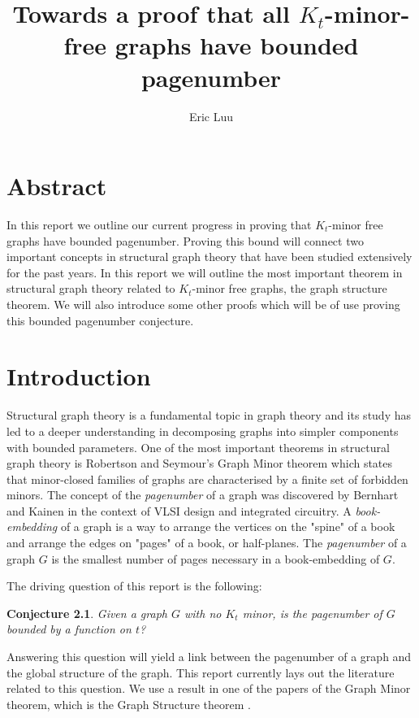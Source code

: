\documentclass[]{report}
\title{Towards a proof that all $K_t$-minor-free graphs have bounded pagenumber}
\author{Eric Luu}
\newtheorem{conjecture}[theorem]{Conjecture}
\theoremstyle{definition}
\numberwithin{theorem}{section}
\numberwithin{equation}{section}
\begin{document}
\maketitle
\chapter{Abstract}\label{abstract}
In this report we outline our current progress in proving that $K_t$-minor free graphs have bounded pagenumber. Proving this bound will connect two important concepts in structural graph theory that have been studied extensively for the past years. In this report we will outline the most important theorem in structural graph theory related to $K_t$-minor free graphs, the graph structure theorem. We will also introduce some other proofs which will be of use proving this bounded pagenumber conjecture. 
\chapter{Introduction}\label{sec:introduction}
Structural graph theory is a fundamental topic in graph theory and its study has led to a deeper understanding in decomposing graphs into simpler components with bounded parameters. One of the most important theorems in structural graph theory is Robertson and Seymour's Graph Minor theorem \cite{robertsonGraphMinorsXX2004} which states that minor-closed families of graphs are characterised by a finite set of forbidden minors. 
The concept of the \textit{pagenumber} of a graph was discovered by Bernhart and Kainen \cite{bernhartBookThicknessGraph1979} in the context of VLSI design and integrated circuitry. A \textit{book-embedding} of a graph is a way to arrange the vertices on the "spine" of a book and arrange the edges on "pages" of a book, or half-planes. The \textit{pagenumber} of a graph $G$ is the smallest number of pages necessary in a book-embedding of $G$. 

The driving question of this report is the following: 
\begin{conjecture}\label{conj:bded_had_pn}
	Given a graph $G$ with no $K_t$ minor, is the pagenumber of $G$ bounded by a function on $t$?
\end{conjecture}
Answering this question will yield a link between the pagenumber of a graph and the global structure of the graph. This report currently lays out the literature related to this question. We use a result in one of the papers of the Graph Minor theorem, which is the Graph Structure theorem \cite{robertsonGraphMinorsXVI2003}.
\end{document}
